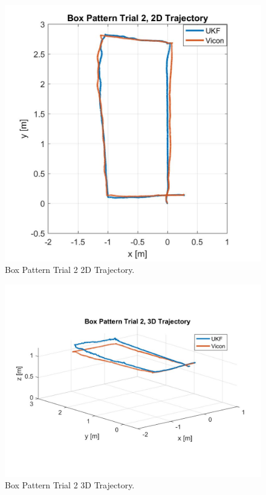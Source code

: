 \begin{figure}[p]
  \centering
    \includegraphics[height=0.4\textheight]{box2_2d}
  \caption[Box Pattern Trial 2 2D Trajectory]{Box Pattern Trial 2 2D Trajectory.}
  \label{fig:box2_2d}
\end{figure}
\begin{figure}[p]
  \centering
    \includegraphics[height=0.4\textheight]{box2_3d}
  \caption[Box Pattern Trial 2 3D Trajectory]{Box Pattern Trial 2 3D Trajectory.}
  \label{fig:box2_3d}
\end{figure}
\clearpage

